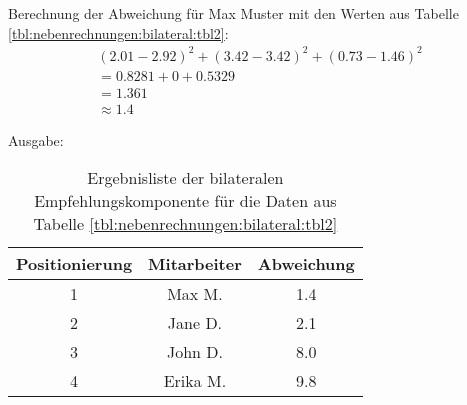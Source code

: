 Berechnung der Abweichung für Max Muster mit den Werten aus Tabelle \ref{tbl:nebenrechnungen:bilateral:tbl2}:
\begin{gather}
	\nonumber (2.01-2.92)^2 + (3.42-3.42)^2 + (0.73-1.46)^2\\
	\nonumber = 0.8281 + 0 + 0.5329\\
	\nonumber = 1.361\\
	\approx 1.4
	\label{frml:nebenrechnungen:bilateral:max}
\end{gather}

Ausgabe:
\begin{table}[h]
	\centering
	\begin{tabular}{c|c|c}
		Positionierung & Mitarbeiter & Abweichung\\
		\hline
		1 & Max M.   & 1.4\\
		2 & Jane D.  & 2.1\\
		3 & John D.  & 8.0\\
		4 & Erika M. & 9.8
	\end{tabular}
	\caption{Ergebnisliste der bilateralen Empfehlungskomponente für die Daten aus Tabelle \ref{tbl:nebenrechnungen:bilateral:tbl2}}
	\label{tbl:nebenrechnungen:bilateral:ausgabe}
\end{table}
